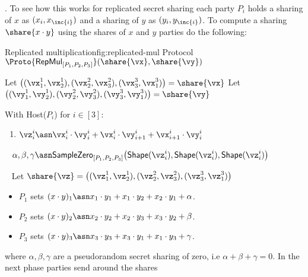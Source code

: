 . 
To see how this works for replicated secret sharing each party $P_i$ holds a
sharing of $x$ as $(x_i, x_{ \inc{i} })$ and a sharing of $y$ as $(y_i, y_{
\inc{i} })$. To compute a sharing $\share{x \cdot y}$ using the shares of $x$
and $y$ parties do the following:



\begin{Boxfig}{Replicated multiplication}{fig:replicated-mul}
  {Protocol $\Proto{\mathsf{RepMul}_{[P_1, P_2, P_3]}}(\share{\vx}, \share{\vy})$}
  
  Let $\big((\vx_1^1, \vx_2^1), (\vx_2^2, \vx_3^2), (\vx_3^3, \vx_1^3) \big) = \share{\vx}$ \newline
  Let $\big((\vy_1^1, \vy_2^1), (\vy_2^2, \vy_3^2), (\vy_3^3, \vy_1^3) \big) = \share{\vy}$ \newline
  
  With Host($P_i$) for $i \in [3]$:
  \begin{enumerate}
    \item $\vz_i^i \asn \vx_i^i \cdot \vy_i^i + \vx_i^i \cdot \vy_{i+1}^i + \vx_{i+1}^i \cdot \vy_i^i$
  \end{enumerate}
  ~\newline
  $\alpha, \beta, \gamma \asn \mathsf{SampleZero}_{[P_1, P_2, P_3]}\big( \mathsf{Shape}(\vz_i^i), \mathsf{Shape}\mathsf(\vz_i^i), \mathsf{Shape}\mathsf(\vz_i^i) \big)$
  
  ~\newline
  Let $\share{\vz} = \big((\vz_1^1, \vz_2^1), (\vz_2^2, \vz_3^2), (\vz_3^3, \vz_1^3) \big)$
  
  
\end{Boxfig}

\begin{itemize}
    \item $P_1$ sets $(x \cdot y)_{1} \asn x_1 \cdot y_1 + x_1 \cdot y_2 + x_2 \cdot
    y_1 + \alpha$.
    \item $P_2$ sets $(x \cdot y)_2 \asn x_2 \cdot y_2 + x_2 \cdot y_3 + x_3
    \cdot y_2 + \beta$.
    \item $P_3$ sets $(x \cdot y)_3 \asn x_3 \cdot y_3 + x_3 \cdot y_1 + x_1 \cdot y_3 +
    \gamma$.
\end{itemize}

\noindent where $\alpha, \beta, \gamma$ are a pseudorandom secret sharing of
zero, i.e $\alpha + \beta + \gamma = 0$. In the next phase parties send
around the shares

